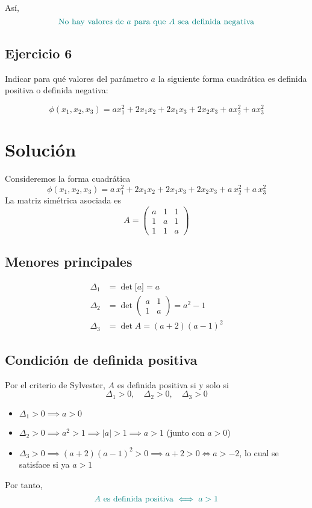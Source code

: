 \documentclass{article}
\begin{document}
Así,
\[
\color{teal}
\text{No hay valores de }a\text{ para que }A\text{ sea definida negativa}
\]


\newpage
\subsection{Ejercicio 6}

Indicar para qué valores del parámetro \(a\) la siguiente forma cuadrática es definida positiva o definida negativa:

\[
\phi(x_1, x_2, x_3) = a x_1^2 + 2x_1 x_2 + 2x_1 x_3 + 2x_2 x_3 + a x_2^2 + a x_3^2
\]
\newpage
\section*{Solución}

Consideremos la forma cuadrática
\[
\phi(x_1,x_2,x_3)
= a\,x_1^2 + 2x_1x_2 + 2x_1x_3 + 2x_2x_3 + a\,x_2^2 + a\,x_3^2
\]
La matriz simétrica asociada es
\[
A = 
\begin{pmatrix}
a & 1 & 1\\[6pt]
1 & a & 1\\[3pt]
1 & 1 & a
\end{pmatrix}
\]

\subsection*{Menores principales}

\[
\begin{aligned}
\Delta_1 &= \det\bigl[a\bigr] = a\\[4pt]
\Delta_2 &= \det
\begin{pmatrix}
a & 1\\[2pt]
1 & a
\end{pmatrix}
= a^2 - 1\\[6pt]
\Delta_3 &= \det A
= (a+2)(a-1)^2
\end{aligned}
\]

\subsection*{Condición de definida positiva}

Por el criterio de Sylvester, \(A\) es definida positiva si y solo si
\[
\Delta_1>0,\quad \Delta_2>0,\quad \Delta_3>0
\]
\begin{itemize}
  \item \(\Delta_1>0\implies a>0\)
  \item \(\Delta_2>0\implies a^2>1\implies |a|>1\implies a>1\) (junto con \(a>0\))
  \item \(\Delta_3>0\implies (a+2)(a-1)^2>0\implies a+2>0\iff a>-2\),
        lo cual se satisface si ya \(a>1\)
\end{itemize}
Por tanto,
\[
\color{teal}
A\text{ es definida positiva} \iff a>1
\]
\end{document}
